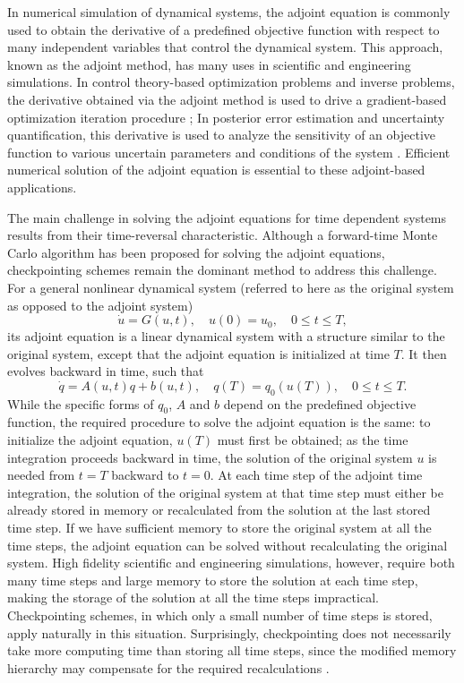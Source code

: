 \documentclass[oneeqnum, onethmnum, onefignum, onetabnum]{siamltex}
\begin{document}
In numerical simulation of dynamical systems, the adjoint equation is commonly
used to obtain the derivative of a predefined objective function with respect
to many independent variables that control the dynamical system.  This
approach, known as the adjoint method, has many uses in scientific and
engineering simulations.  In control theory-based optimization problems and
inverse problems, the derivative obtained via the adjoint method is used to
drive a gradient-based optimization iteration procedure \cite{bewley01}
\cite{jameson1988}; In
posterior error estimation and uncertainty quantification, this derivative is
used to analyze the sensitivity of an objective function to various uncertain
parameters and conditions of the system \cite{pierce2002} \cite{giles2002}.
Efficient numerical solution of the adjoint equation is essential to these
adjoint-based applications.

The main challenge in solving the adjoint equations for time dependent systems
results from their time-reversal characteristic.
Although a forward-time Monte Carlo algorithm \cite{wangjcp} has been
proposed for solving the adjoint equations, checkpointing schemes remain the
dominant method to address this challenge.  For a general
nonlinear dynamical system (referred to here as the original system as
opposed to the adjoint system)
\[
    \dot{u} = G(u, t), \quad u(0) = u_0, \quad 0 \le t \le T,
\]
its adjoint equation is a linear dynamical system with a structure similar to
the original system, except that the adjoint equation is initialized at time
$T$.  It then evolves backward in time, such that
\[
    \dot{q} = A(u, t) q + b(u, t), \quad q(T) = q_0(u(T)), \quad 0 \le t \le T.
\]
While the specific forms of $q_0$, $A$ and $b$ depend on the predefined
objective function, the required procedure to solve the adjoint equation is
the same: to initialize the adjoint equation, $u(T)$ must first be obtained; as
the time integration proceeds backward in time, the solution of the original
system $u$ is needed from $t=T$ backward to $t=0$.  At each time step of the
adjoint time integration, the solution of the original system at that time step
must either be already stored in memory or recalculated from the solution
at the last stored time step.  If we have sufficient memory to store the
original system at all the time steps, the adjoint equation can be solved
without recalculating the original system.  High fidelity scientific and
engineering simulations, however, require both many time steps and large
memory to store the solution at each time step, making the storage of the
solution at all the time steps impractical.  Checkpointing schemes, in which
only a small number of time steps is stored, apply naturally in this situation.
Surprisingly, checkpointing does not necessarily take more computing time
than storing all time steps, since the modified memory hierarchy may compensate
for the required recalculations \cite{andrea06}.
\end{document}

